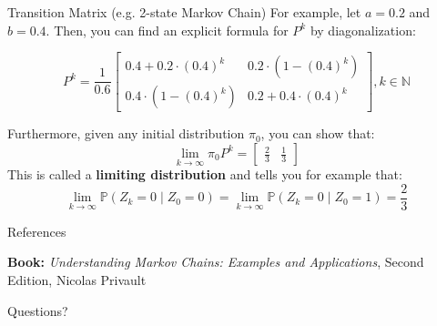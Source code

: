 \documentclass{beamer}
\newcommand{\N}{\mathbb{N}}
\newcommand{\Pb}{\mathbb{P}}
\begin{document}
\begin{frame}{Transition Matrix (e.g. 2-state Markov Chain)}
For example, let $a = 0.2$ and $b = 0.4$. Then, you can find an explicit formula for $P^k$ by diagonalization:

    $$P^k = \frac{1}{0.6}\begin{bmatrix}
    0.4 + 0.2\cdot(0.4)^k & 0.2\cdot(1-(0.4)^k) \\
    0.4\cdot(1 - (0.4)^k) & 0.2 + 0.4\cdot(0.4)^k
    \end{bmatrix}, k \in \N
    $$

    Furthermore, given any initial distribution $\pi_0$, you can show that:
    $$\lim_{k\rightarrow \infty}\pi_0 P^k = \begin{bmatrix}\frac{2}{3}&\frac{1}{3}\end{bmatrix}$$
    This is called a \textbf{limiting distribution} and tells you for example that:
    $$\lim_{k\rightarrow\infty}\Pb(Z_k = 0\mid Z_0 = 0) =\lim_{k\rightarrow\infty}\Pb(Z_k = 0\mid Z_0 = 1) =  \frac{2}{3}$$

\end{frame}

\begin{frame}{References}

    \textbf{Book:} \textit{Understanding Markov Chains: Examples and Applications}, Second Edition, Nicolas Privault
    \newline


    \begin{center}
        Questions?
    \end{center}

\end{frame}
\end{document}
